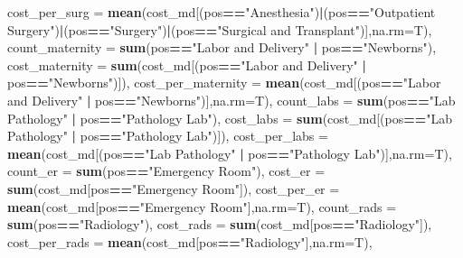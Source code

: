 \documentclass[]{article}
\newenvironment{Shaded}{\begin{snugshade}}{\end{snugshade}}
\newcommand{\KeywordTok}[1]{\textcolor[rgb]{0.13,0.29,0.53}{\textbf{#1}}}
\newcommand{\DataTypeTok}[1]{\textcolor[rgb]{0.13,0.29,0.53}{#1}}
\newcommand{\StringTok}[1]{\textcolor[rgb]{0.31,0.60,0.02}{#1}}
\newcommand{\OperatorTok}[1]{\textcolor[rgb]{0.81,0.36,0.00}{\textbf{#1}}}
\newcommand{\NormalTok}[1]{#1}
\begin{document}
\begin{Shaded}
\begin{Highlighting}[]
{{{            \DataTypeTok{cost_per_surg =} \KeywordTok{mean}\NormalTok{(cost_md[(pos}\OperatorTok{==}\StringTok{"Anesthesia"}\NormalTok{)}\OperatorTok{|}\NormalTok{(pos}\OperatorTok{==}\StringTok{"Outpatient Surgery"}\NormalTok{)}\OperatorTok{|}\NormalTok{(pos}\OperatorTok{==}\StringTok{"Surgery"}\NormalTok{)}\OperatorTok{|}\NormalTok{(pos}\OperatorTok{==}\StringTok{"Surgical and Transplant"}\NormalTok{)],}\DataTypeTok{na.rm=}\NormalTok{T),}
            \DataTypeTok{count_maternity =} \KeywordTok{sum}\NormalTok{(pos}\OperatorTok{==}\StringTok{"Labor and Delivery"} \OperatorTok{|}\StringTok{ }\NormalTok{pos}\OperatorTok{==}\StringTok{"Newborns"}\NormalTok{),}
            \DataTypeTok{cost_maternity =} \KeywordTok{sum}\NormalTok{(cost_md[(pos}\OperatorTok{==}\StringTok{"Labor and Delivery"} \OperatorTok{|}\StringTok{ }\NormalTok{pos}\OperatorTok{==}\StringTok{"Newborns"}\NormalTok{)]),}
            \DataTypeTok{cost_per_maternity =} \KeywordTok{mean}\NormalTok{(cost_md[(pos}\OperatorTok{==}\StringTok{"Labor and Delivery"} \OperatorTok{|}\StringTok{ }\NormalTok{pos}\OperatorTok{==}\StringTok{"Newborns"}\NormalTok{)],}\DataTypeTok{na.rm=}\NormalTok{T),}
            \DataTypeTok{count_labs =} \KeywordTok{sum}\NormalTok{(pos}\OperatorTok{==}\StringTok{"Lab Pathology"} \OperatorTok{|}\StringTok{ }\NormalTok{pos}\OperatorTok{==}\StringTok{"Pathology Lab"}\NormalTok{),}
            \DataTypeTok{cost_labs =} \KeywordTok{sum}\NormalTok{(cost_md[(pos}\OperatorTok{==}\StringTok{"Lab Pathology"} \OperatorTok{|}\StringTok{ }\NormalTok{pos}\OperatorTok{==}\StringTok{"Pathology Lab"}\NormalTok{)]),}
            \DataTypeTok{cost_per_labs =} \KeywordTok{mean}\NormalTok{(cost_md[(pos}\OperatorTok{==}\StringTok{"Lab Pathology"} \OperatorTok{|}\StringTok{ }\NormalTok{pos}\OperatorTok{==}\StringTok{"Pathology Lab"}\NormalTok{)],}\DataTypeTok{na.rm=}\NormalTok{T),}
            \DataTypeTok{count_er =} \KeywordTok{sum}\NormalTok{(pos}\OperatorTok{==}\StringTok{"Emergency Room"}\NormalTok{),}
            \DataTypeTok{cost_er =} \KeywordTok{sum}\NormalTok{(cost_md[pos}\OperatorTok{==}\StringTok{"Emergency Room"}\NormalTok{]),}
            \DataTypeTok{cost_per_er =} \KeywordTok{mean}\NormalTok{(cost_md[pos}\OperatorTok{==}\StringTok{"Emergency Room"}\NormalTok{],}\DataTypeTok{na.rm=}\NormalTok{T),}
            \DataTypeTok{count_rads =} \KeywordTok{sum}\NormalTok{(pos}\OperatorTok{==}\StringTok{"Radiology"}\NormalTok{),}
            \DataTypeTok{cost_rads =} \KeywordTok{sum}\NormalTok{(cost_md[pos}\OperatorTok{==}\StringTok{"Radiology"}\NormalTok{]),}
            \DataTypeTok{cost_per_rads =} \KeywordTok{mean}\NormalTok{(cost_md[pos}\OperatorTok{==}\StringTok{"Radiology"}\NormalTok{],}\DataTypeTok{na.rm=}\NormalTok{T),}
}}}
\end{Highlighting}
\end{Shaded}
\end{document}
